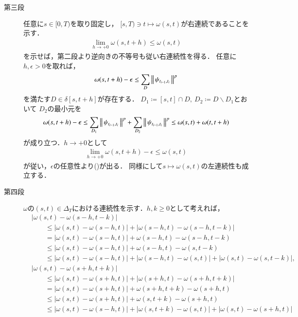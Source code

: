 \begin{prf}
\begin{description}
			\item[第三段]
				任意に$s \in [0,T)$を取り固定し，
				$[s,T) \ni t \longmapsto \omega(s,t)$が右連続であることを示す．
				\begin{align}
					\lim_{h \to +0} \omega(s,t+h) \leq \omega(s,t)
					\label{eq:thm_continuity_of_norm_val_p_variation_3}
				\end{align}
				を示せば，第二段より逆向きの不等号も従い右連続性を得る．
				任意に$h,\epsilon > 0$を取れば，
				\begin{align}
					\omega(s,t + h) - \epsilon
					\leq \sum_D \left\|\, \psi_{t_{i-1},t_i}\, \right\|_{}^p
				\end{align}
				を満たす$D \in \delta[s,t+h]$が存在する．
				$D_1 \coloneqq [s,t] \cap D,\ D_2 \coloneqq D \backslash D_1$とおいて
				$D_2$の最小元を
				\begin{align}
					\omega(s,t + h) - \epsilon
					\leq \sum_{D_1} \left\|\, \psi_{t_{i-1},t_i}\, \right\|_{}^p + \sum_{D_2} \left\|\, \psi_{t_{i-1},t_i}\, \right\|_{}^p
					\leq \omega(s,t) + \omega(t,t+h)
				\end{align}
				が成り立つ．$h \longrightarrow +0$として
				\begin{align}
					\lim_{h \to +0} \omega(s,t+h) - \epsilon \leq \omega(s,t)
				\end{align}
				が従い，$\epsilon$の任意性より()が出る．
				同様にして$s \longmapsto \omega(s,t)$の左連続性も成立する．
				
			\item[第四段]
				$\omega$の$(s,t) \in \Delta_T$における連続性を示す．$h,k \geq 0$として考えれば，
				\begin{align}
					&|\omega(s,t) - \omega(s-h,t-k)| \\
					&\qquad\leq |\omega(s,t) - \omega(s-h,t)| + |\omega(s-h,t) - \omega(s-h,t-k)| \\
					&\qquad= |\omega(s,t) - \omega(s-h,t)| + \omega(s-h,t) - \omega(s-h,t-k) \\
					&\qquad\leq |\omega(s,t) - \omega(s-h,t)| + \omega(s-h,t) - \omega(s,t-k) \\
					&\qquad\leq |\omega(s,t) - \omega(s-h,t)| + |\omega(s-h,t) - \omega(s,t)| + |\omega(s,t) - \omega(s,t-k)|, \\
					&|\omega(s,t) - \omega(s+h,t+k)| \\
					&\qquad\leq |\omega(s,t) - \omega(s+h,t)| + |\omega(s+h,t) - \omega(s+h,t+k)| \\
					&\qquad= |\omega(s,t) - \omega(s+h,t)| + \omega(s+h,t+k) - \omega(s+h,t) \\
					&\qquad\leq |\omega(s,t) - \omega(s+h,t)| + \omega(s,t+k) - \omega(s+h,t) \\
					&\qquad\leq |\omega(s,t) - \omega(s-h,t)| + |\omega(s,t+k) - \omega(s,t)| + |\omega(s,t) - \omega(s+h,t)|
				\end{align}
		\end{description}
	\end{prf}
	
